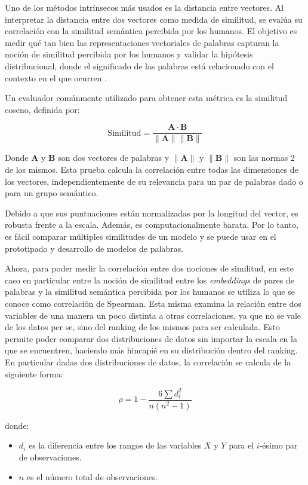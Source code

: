 Uno de los métodos intrínsecos más usados es la distancia entre vectores. Al interpretar la distancia entre dos vectores como medida de similitud, se evalúa su correlación con la similitud semántica percibida por los humanos. El objetivo es medir qué tan bien las representaciones vectoriales de palabras capturan la noción de similitud percibida por los humanos y validar la hipótesis distribucional, donde el significado de las palabras está relacionado con el contexto en el que ocurren \parencite{Wang_2019}.

Un evaluador comúnmente utilizado para obtener esta métrica es la similitud coseno, definida por:

\[
\text{Similitud} = \frac{\mathbf{A} \cdot \mathbf{B}}{\|\mathbf{A}\| \|\mathbf{B}\|}
\]

Donde \( \mathbf{A} \) y \( \mathbf{B} \) son dos vectores de palabras y \( \|\mathbf{A}\| \) y \( \|\mathbf{B}\| \) son las normas 2 de los mismos. Esta prueba calcula la correlación entre todas las dimensiones de los vectores, independientemente de su relevancia para un par de palabras dado o para un grupo semántico.

Debido a que sus puntuaciones están normalizadas por la longitud del vector, es robusta frente a la escala. Además, es computacionalmente barata. Por lo tanto, es fácil comparar múltiples similitudes de un modelo y se puede usar en el prototipado y desarrollo de modelos de palabras.

Ahora, para poder medir la correlación entre dos nociones de similitud, en este caso en particular entre la noción de similitud entre los \textit{embeddings} de pares de palabras y la similitud semántica percibida por los humanos se utiliza lo que se conoce como correlación de Spearman. Esta misma examina la relación entre dos variables de una manera un poco distinta a otras correlaciones, ya que no se vale de los datos per se, sino del ranking de los mismos para ser calculada. Esto permite poder comparar dos distribuciones de datos sin importar la escala en la que se encuentren, haciendo más hincapié en su distribución dentro del ranking. En particular dadas dos distribuciones de datos, la correlación se calcula de la siguiente forma:

\[
\rho = 1 - \frac{6 \sum d_i^2}{n(n^2 - 1)}
\]

donde:
\begin{itemize}
    \item \( d_i \) es la diferencia entre los rangos de las variables \( X \) y \( Y \) para el \( i \)-ésimo par de observaciones.
    \item \( n \) es el número total de observaciones.
\end{itemize}

